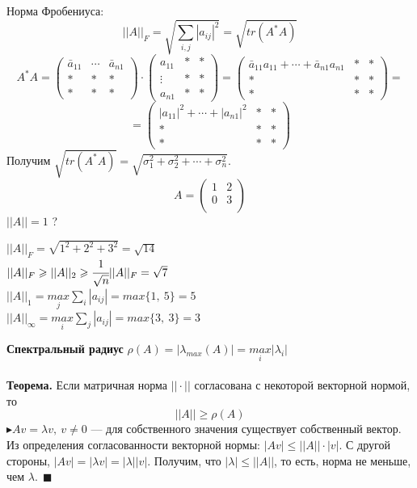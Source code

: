 \documentclass[12pt]{article}
\theoremstyle{definition}
\numberwithin{equation}{section}
\begin{document}
	~\\ \\Норма Фробениуса: $$||A||_F=\sqrt{\sum\limits_{i,j}|a_{ij}|^2}=\sqrt{tr(A^*A)}$$
	\[A^*A=\begin{pmatrix}
	\bar a_{11} & \cdots & \bar a_{n1}\\
	* & * & *\\
	* & * & *
	\end{pmatrix} \cdot \begin{pmatrix}
	a_{11} & * & *\\
	\vdots & * & *\\
	a_{n1} & * & *
	\end{pmatrix} = \begin{pmatrix}
	\bar a_{11} a_{11}+\cdots+\bar a_{n1} a_{n1} & * & *\\
	* & * & *\\
	* & * & *
	\end{pmatrix}=\] \[=\begin{pmatrix}
	|a_{11}|^2+\cdots +|a_{n1}|^2 & * & *\\
	* & * & *\\
	* & * & *
	\end{pmatrix}\]
	Получим $\sqrt{tr(A^*A)}=\sqrt{\sigma_1^2+\sigma_2^2+\cdots+\sigma_n^2}$.
	\[A=\begin{pmatrix}
	1 & 2\\
	0 & 3\\
	\end{pmatrix}\]
	$||A||=1$ ?\begin{center}
		$||A||_F=\sqrt{1^2+2^2+3^2}=\sqrt{14}$\\
		$||A||_F \geqslant ||A||_2 \geqslant \cfrac{1}{\sqrt{n}}||A||_F=\sqrt{7}$\\
		$||A||_1=\underset{j}{max}\sum\limits_i|a_{ij}|=max\{1,~5\}=5$\\
		$||A||_{\infty}=\underset{i}{max}\sum\limits_j|a_{ij}|=max\{3,~3\}=3$\end{center}
	\textbf{Спектральный радиус} $\rho(A)=|\lambda_{max}(A)|=\underset{i}{max}|\lambda_i|$\\
	\\
	\textbf{Теорема.} Если матричная норма $||\cdot||$ согласована с некоторой векторной нормой, то $$||A|| \geqslant \rho(A)$$
	$\blacktriangleright Av=\lambda v,~v\neq 0$ --- для собственного значения существует собственный вектор.\\
	Из определения согласованности векторной нормы: $|Av|\leqslant ||A||\cdot|v|$.
	С другой стороны, $|Av|=|\lambda v|=|\lambda||v|$. Получим, что $|\lambda|\leqslant ||A||$, то есть, норма не меньше, чем $\lambda.~~\blacksquare$\\
\end{document}
